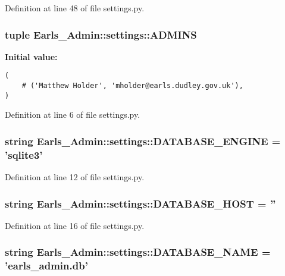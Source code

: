 Definition at line 48 of file settings.py.\hypertarget{namespaceEarls__Admin_1_1settings_04195fa9f10b3fbebb2ecde7801d761a}{
\subsubsection[ADMINS]{\setlength{\rightskip}{0pt plus 5cm}tuple {\bf Earls\_\-Admin::settings::ADMINS}}}
\label{namespaceEarls__Admin_1_1settings_04195fa9f10b3fbebb2ecde7801d761a}


\textbf{Initial value:}

\begin{Code}\begin{verbatim}(
    # ('Matthew Holder', 'mholder@earls.dudley.gov.uk'),
)
\end{verbatim}
\end{Code}


Definition at line 6 of file settings.py.\hypertarget{namespaceEarls__Admin_1_1settings_a0b972de8fdc5f3480cbc0fdce6e6354}{
\subsubsection[DATABASE\_\-ENGINE]{\setlength{\rightskip}{0pt plus 5cm}string {\bf Earls\_\-Admin::settings::DATABASE\_\-ENGINE} = 'sqlite3'}}
\label{namespaceEarls__Admin_1_1settings_a0b972de8fdc5f3480cbc0fdce6e6354}




Definition at line 12 of file settings.py.\hypertarget{namespaceEarls__Admin_1_1settings_06af6e2225b0b042f536fc7596fd7f95}{
\subsubsection[DATABASE\_\-HOST]{\setlength{\rightskip}{0pt plus 5cm}string {\bf Earls\_\-Admin::settings::DATABASE\_\-HOST} = ''}}
\label{namespaceEarls__Admin_1_1settings_06af6e2225b0b042f536fc7596fd7f95}




Definition at line 16 of file settings.py.\hypertarget{namespaceEarls__Admin_1_1settings_959098d02bb89997480f506b3487b1a1}{
\subsubsection[DATABASE\_\-NAME]{\setlength{\rightskip}{0pt plus 5cm}string {\bf Earls\_\-Admin::settings::DATABASE\_\-NAME} = 'earls\_\-admin.db'}}
\label{namespaceEarls__Admin_1_1settings_959098d02bb89997480f506b3487b1a1}




